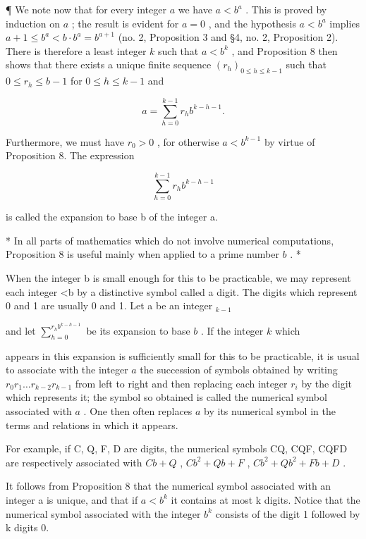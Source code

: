 ¶ We note now that for every integer \(a\) we have \(a < b^a\) . This is proved by induction on \(a\) ; the result is evident for \(a = 0\) , and the hypothesis \(a < b^a\) implies \(a + 1 \leqslant b^a < b \cdot b^a = b^{a+1}\) (no. 2, Proposition 3 and §4, no. 2, Proposition 2). There is therefore a least integer \(k\) such that \(a < b^k\) , and Proposition 8 then shows that there exists a unique finite sequence \((r_h)_{0 \leqslant h \leqslant k-1}\) such that \(0 \leqslant r_h \leqslant b - 1\) for \(0 \leqslant h \leqslant k - 1\) and

\[
a = \sum_ {h = 0} ^ {k - 1} r _ {h} b ^ {k - h - 1}.
\]

Furthermore, we must have \(r_{0} > 0\) , for otherwise \(a < b^{k-1}\) by virtue of Proposition 8. The expression

\[
\sum_ {h = 0} ^ {k - 1} r _ {h} b ^ {k - h - 1}
\]

is called the expansion to base b of the integer a.

* In all parts of mathematics which do not involve numerical computations, Proposition 8 is useful mainly when applied to a prime number \(b\) . *

When the integer b is small enough for this to be practicable, we may represent each integer \textless b by a distinctive symbol called a digit. The digits which represent 0 and 1 are usually 0 and 1. Let a be an integer \(_{k-1}\)

and let \(\sum_{h=0}^{r_h b^{k-h-1}}\) be its expansion to base \(b\) . If the integer \(k\) which

appears in this expansion is sufficiently small for this to be practicable, it is usual to associate with the integer \(a\) the succession of symbols obtained by writing \(r_0r_1 \ldots r_{k-2}r_{k-1}\) from left to right and then replacing each integer \(r_i\) by the digit which represents it; the symbol so obtained is called the numerical symbol associated with \(a\) . One then often replaces \(a\) by its numerical symbol in the terms and relations in which it appears.

For example, if C, Q, F, D are digits, the numerical symbols CQ, CQF, CQFD are respectively associated with \(Cb + Q\) , \(Cb^{2} + Qb + F\) , \(Cb^{2} + Qb^{2} + Fb + D\) .

It follows from Proposition 8 that the numerical symbol associated with an integer a is unique, and that if \(a < b^{k}\) it contains at most k digits. Notice that the numerical symbol associated with the integer \(b^{k}\) consists of the digit 1 followed by k digits 0.

